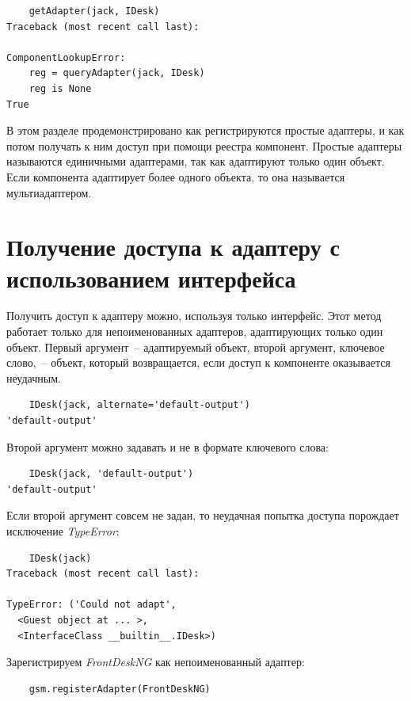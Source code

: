 \documentclass[a4paper,openany,twoside,final]{book}
\providecommand*{\DUroletitlereference}[1]{\textsl{#1}}
\begin{document}
\begin{verbatim}
    getAdapter(jack, IDesk)
Traceback (most recent call last):

ComponentLookupError:
    reg = queryAdapter(jack, IDesk)
    reg is None
True
\end{verbatim}

В этом разделе продемонстрировано как регистрируются простые адаптеры, и как потом получать к ним доступ при помощи реестра компонент.  Простые адаптеры называются единичными адаптерами, так как адаптируют только один объект.  Если компонента адаптирует более одного объекта, то она называется мультиадаптером.


\section{Получение доступа к адаптеру с использованием интерфейса%
  \label{id37}%
}

Получить доступ к адаптеру можно, используя только интерфейс.  Этот метод работает только для непоименованных адаптеров, адаптирующих только один объект.  Первый аргумент~-- адаптируемый объект, второй аргумент, ключевое слово,~-- объект, который возвращается, если доступ к компоненте оказывается неудачным.

\begin{verbatim}
    IDesk(jack, alternate='default-output')
'default-output'
\end{verbatim}

Второй аргумент можно задавать и не в формате ключевого слова:

\begin{verbatim}
    IDesk(jack, 'default-output')
'default-output'
\end{verbatim}

Если второй аргумент совсем не задан, то неудачная попытка доступа
порождает исключение \DUroletitlereference{TypeError}:

\begin{verbatim}
    IDesk(jack)
Traceback (most recent call last):

TypeError: ('Could not adapt',
  <Guest object at ... >,
  <InterfaceClass __builtin__.IDesk>)
\end{verbatim}

Зарегистрируем \DUroletitlereference{FrontDeskNG} как непоименованный адаптер:

\begin{verbatim}
    gsm.registerAdapter(FrontDeskNG)
\end{verbatim}
\end{document}

